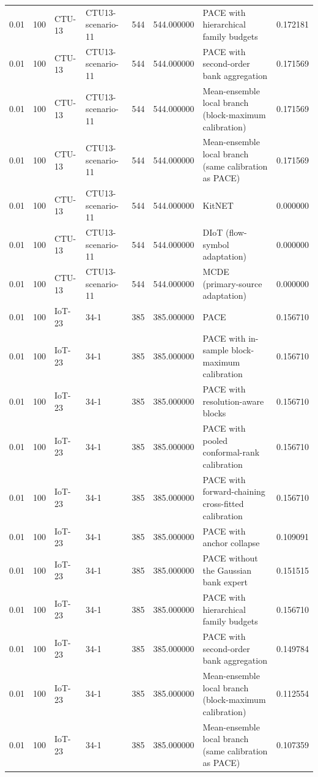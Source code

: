 \begin{tabular}{llllllll}
0.01 & 100 & CTU-13 & CTU13-scenario-11 & 544 & 544.000000 & PACE with hierarchical family budgets & 0.172181 \\
0.01 & 100 & CTU-13 & CTU13-scenario-11 & 544 & 544.000000 & PACE with second-order bank aggregation & 0.171569 \\
0.01 & 100 & CTU-13 & CTU13-scenario-11 & 544 & 544.000000 & Mean-ensemble local branch (block-maximum calibration) & 0.171569 \\
0.01 & 100 & CTU-13 & CTU13-scenario-11 & 544 & 544.000000 & Mean-ensemble local branch (same calibration as PACE) & 0.171569 \\
0.01 & 100 & CTU-13 & CTU13-scenario-11 & 544 & 544.000000 & KitNET & 0.000000 \\
0.01 & 100 & CTU-13 & CTU13-scenario-11 & 544 & 544.000000 & DIoT (flow-symbol adaptation) & 0.000000 \\
0.01 & 100 & CTU-13 & CTU13-scenario-11 & 544 & 544.000000 & MCDE (primary-source adaptation) & 0.000000 \\
0.01 & 100 & IoT-23 & 34-1 & 385 & 385.000000 & PACE & 0.156710 \\
0.01 & 100 & IoT-23 & 34-1 & 385 & 385.000000 & PACE with in-sample block-maximum calibration & 0.156710 \\
0.01 & 100 & IoT-23 & 34-1 & 385 & 385.000000 & PACE with resolution-aware blocks & 0.156710 \\
0.01 & 100 & IoT-23 & 34-1 & 385 & 385.000000 & PACE with pooled conformal-rank calibration & 0.156710 \\
0.01 & 100 & IoT-23 & 34-1 & 385 & 385.000000 & PACE with forward-chaining cross-fitted calibration & 0.156710 \\
0.01 & 100 & IoT-23 & 34-1 & 385 & 385.000000 & PACE with anchor collapse & 0.109091 \\
0.01 & 100 & IoT-23 & 34-1 & 385 & 385.000000 & PACE without the Gaussian bank expert & 0.151515 \\
0.01 & 100 & IoT-23 & 34-1 & 385 & 385.000000 & PACE with hierarchical family budgets & 0.156710 \\
0.01 & 100 & IoT-23 & 34-1 & 385 & 385.000000 & PACE with second-order bank aggregation & 0.149784 \\
0.01 & 100 & IoT-23 & 34-1 & 385 & 385.000000 & Mean-ensemble local branch (block-maximum calibration) & 0.112554 \\
0.01 & 100 & IoT-23 & 34-1 & 385 & 385.000000 & Mean-ensemble local branch (same calibration as PACE) & 0.107359 \\

\end{tabular}
